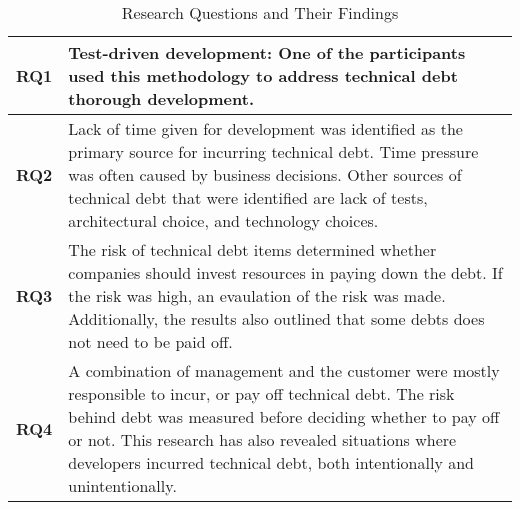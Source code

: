 \begin{table}[!ht]
\centering
\caption{Research Questions and Their Findings}
\label{tab:rqanseer}
\begin{tabular}{|l|p{12cm}|}

\hline

\textbf{RQ1} & Test-driven development: One of the participants used this methodology to address technical debt thorough development. \\ \hline
\textbf{RQ2} & Lack of time given for development was identified as the primary source for incurring technical debt. Time pressure was often caused by business decisions. Other sources of technical debt that were identified are lack of tests, architectural choice, and technology choices. \\ \hline
\textbf{RQ3} & The risk of technical debt items determined whether companies should invest resources in paying down the debt. If the risk was high, an evaulation of the risk was made. Additionally, the results also outlined that some debts does not need to be paid off.\\ \hline
\textbf{RQ4} & A combination of management and the customer were mostly responsible to incur, or pay off technical debt. The risk behind debt was measured before deciding whether to pay off or not. This research has also revealed situations where developers incurred technical debt, both intentionally and unintentionally. \\ \hline
\end{tabular}
\end{table}




